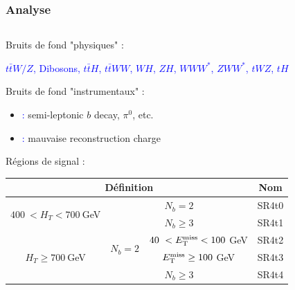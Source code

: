 \begin{frame}
\frametitle{Analyse}
\begin{columns}
\begin{column}{0.65\textwidth}
\begin{maliste}
\item Bruits de fond "physiques" : \\
\begin{small}
\textcolor{blue}{$t\bar{t}W/Z$, Dibosons, $t\bar{t}H$, $t\bar{t}WW$, $WH$, $ZH$, $WWW^*$, $ZWW^*$, $tWZ$, $tH$}
\end{small}
\vspace*{0.2cm}
\item Bruits de fond "instrumentaux" : 
\begin{small}
\begin{itemize}
\item \textcolor{blue}{ :} semi-leptonic $b$ decay, $\pi^0$, etc.
\item \textcolor{blue}{ :} mauvaise reconstruction charge
\end{itemize}
\end{small}
\vspace*{0.2cm}
\item R\'egions de signal :
\end{maliste}

\begin{table}[!htb]
        \begin{center}
\hspace*{-0.8cm}
        \scalebox{0.7} {
        \begin{tabular}{ c | c | c | c }
        \hline
        \multicolumn{3}{c|}{D\'efinition} & Nom \\
        \hline
        \multirow{2}{*}{$400~< H_T < 700~$GeV}               & \multicolumn{2}{c|}{$N_b = 2$} &  SR4t0 \\
        \cline{2-4}
                                        & \multicolumn{2}{c|}{$N_b \geq 3$} &SR4t1 \\
        \hline
        \multirow{3}{*}{$H_T \geq 700~$GeV}                    & \multirow{2}{*}{$N_b = 2$}                            & $40~< \hbox{\ensuremath{E_{\mathrm{T}}^{\mathrm{miss}}}} < 100~$GeV                 &  SR4t2 \\
        \cline{3-4}
                                                                                         &                                                                      & $\hbox{\ensuremath{E_{\mathrm{T}}^{\mathrm{miss}}}}\geq 100~$GeV                                    &  SR4t3 \\
        \cline{2-4}
                                                                                        &  \multicolumn{2}{c|}{$N_b \geq 3$} & SR4t4 \\
        \hline
\end{tabular}
}
\end{center}
\end{table} 


\end{column}
\end{columns}
\end{frame}

